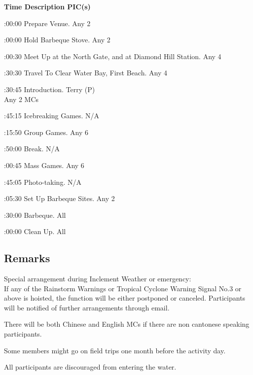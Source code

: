 \setupTABLE[c][1][width=1.25in]
\setupTABLE[c][2][width=3.5in]
\setupTABLE[c][3][width=1.25in]
\bTABLE[split=no]
\bTABLEhead

\bTR\bTH    \bf{Time}
\eTH\bTH    \bf{Description}
\eTH\bTH    \bf{PIC(s)}
\eTH\eTR

\eTABLEhead
\bTABLEbody

\bTR{}:00:00
\eTD\bTD Prepare Venue.
\eTD\bTD Any 2
\eTD\eTR

\bTR{}:00:00
\eTD\bTD Hold Barbeque Stove.
\eTD\bTD Any 2
\eTD\eTR

\bTR{}:00:30
\eTD\bTD Meet Up at the North Gate, and at Diamond Hill Station.
\eTD\bTD Any 4
\eTD\eTR

\bTR{}:30:30
\eTD\bTD Travel To Clear Water Bay, First Beach.
\eTD\bTD Any 4
\eTD\eTR

\bTR{}:30:45
\eTD\bTD Introduction.
\eTD\bTD Terry (P) \\ Any 2 MCs
\eTD\eTR

\bTR{}:45:15
\eTD\bTD Icebreaking Games.
\eTD\bTD N/A
\eTD\eTR

\bTR{}:15:50
\eTD\bTD Group Games.
\eTD\bTD Any 6
\eTD\eTR

\bTR{}:50:00
\eTD\bTD Break.
\eTD\bTD N/A
\eTD\eTR

\bTR{}:00:45
\eTD\bTD Mass Games.
\eTD\bTD Any 6
\eTD\eTR

\bTR{}:45:05
\eTD\bTD Photo-taking.
\eTD\bTD N/A
\eTD\eTR

\bTR{}:05:30
\eTD\bTD Set Up Barbeque Sites.
\eTD\bTD Any 2
\eTD\eTR

\bTR{}:30:00
\eTD\bTD Barbeque.
\eTD\bTD All
\eTD\eTR

\bTR{}:00:00
\eTD\bTD Clean Up.
\eTD\bTD All
\eTD\eTR

\eTABLEbody
\eTABLE

\subsection{Remarks}
\startitemize
\item Special arrangement during Inclement Weather or emergency: \\
If any of the Rainstorm Warnings or Tropical Cyclone Warning Signal No.3 or above is hoisted, the function will be either postponed or canceled. Participants will be notified of further arrangements through email.
\item There will be both Chinese and English MCs if there are non cantonese speaking participants.
\item Some members might go on field trips one month before the activity day.
\item All participants are discouraged from entering the water.
\stopitemize

\stopsection
\pagebreak
